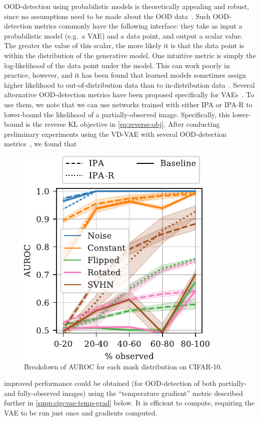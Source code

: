 OOD-detection using probabilistic models is theoretically appealing and robust,
since no assumptions need to be made about the OOD
data~\citep{xiao2020likelihood,havtorn2021hierarchical}. Such OOD-detection
metrics commonly have the following interface: they take as input a
probabilistic model (e.g.~a VAE) and a data point, and output a scalar value.
The greater the value of this scalar, the more likely it is that the data point
is within the distribution of the generative model. One intuitive metric is
simply the log-likelihood of the data point under the model. This can work
poorly in practice, however, and it has been found that learned models sometimes
assign higher likelihood to out-of-distribution data than to in-distribution
data~\citep{nalisnick2018deep}. Several alternative OOD-detection metrics have
been proposed specifically for
VAEs~\citep{xiao2020likelihood,havtorn2021hierarchical}. To use them, we note
that we can use networks trained with either IPA or IPA-R to lower-bound the
likelihood of a partially-observed image. Specifically, this lower-bound is the
reverse KL objective in \cref{eq:reverse-obj}. After conducting preliminary
experiments using the VD-VAE with several OOD-detection
metrics~\citep{xiao2020likelihood,havtorn2021hierarchical}, we found that
\begin{figure}
  \centering
  \includegraphics[scale=.8]{figs/cigcvae/ood-supplementary}
  \caption{Breakdown of AUROC for each mask distribution on CIFAR-10. }
  \label{fig:cigcvae-ood-supplementary}
\end{figure}
improved performance could be obtained (for OOD-detection of both partially- and
fully-observed images) using the ``temperature gradient'' metric described
further in \cref{supp:cigcvae-temp-grad} below.
%
It is efficient to compute, requiring the VAE to be run just once and gradients
computed.

